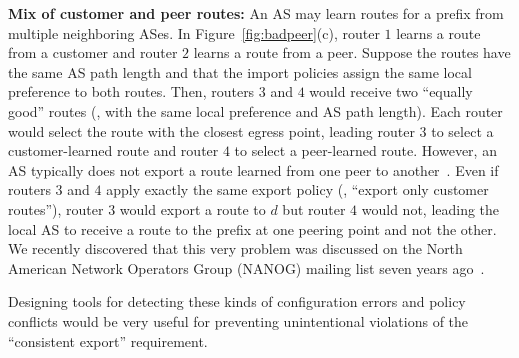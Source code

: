 \noindent
{\bf Mix of customer and peer routes:} An AS may learn routes for a
prefix from multiple neighboring ASes.  In Figure~\ref{fig:badpeer}(c), 
router $1$ learns a route from a customer and router $2$ learns a
route from a peer.  Suppose the routes have the same AS path length
and that the import policies assign the same local preference to both
routes.  Then, routers $3$ and $4$ would receive two ``equally good''
routes (\ie, with the same local preference and AS path length).
Each router would select the route with the closest egress point,
leading router $3$ to select a customer-learned route and router $4$
to select a peer-learned route.  However, an AS typically does not
export a route learned from one peer to another~\cite{Gao2001a}.  Even
if routers $3$ and $4$ apply exactly the same export policy (\ie,
``export only customer routes''), router $3$ would export a route to
$d$ but router $4$ would not, leading the local AS to receive a route
to the prefix at one peering point and not the other.  We recently
discovered that this very problem was discussed on the North American
Network Operators Group (NANOG) mailing list seven years
ago~\cite{nanog-consistent}. 

Designing tools for detecting these kinds of configuration errors and
policy conflicts would be very useful for preventing unintentional
violations of the ``consistent export'' requirement.



\vspace*{-0.1in}
